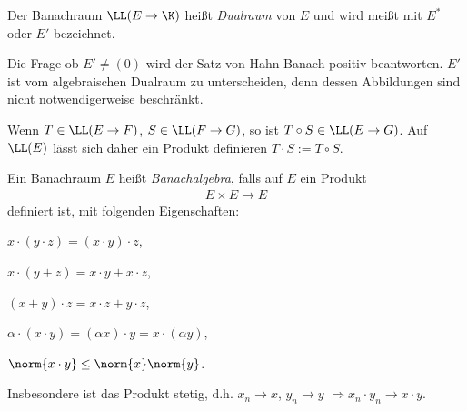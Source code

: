 \begin{defn}
\label{defn:2.10}
Der Banachraum $\LL(E\to\K)$ heißt \emph{Dualraum}
von $E$ und wird meißt mit $E^*$ oder $E'$ bezeichnet.\fishhere
\end{defn}

Die Frage ob $E'\neq(0)$ wird der Satz von Hahn-Banach positiv beantworten.
$E'$ ist vom algebraischen Dualraum zu unterscheiden, denn dessen Abbildungen
sind nicht notwendigerweise beschränkt.

\begin{bem}
\label{bem:2.11}
Wenn $T\in \LL(E\to F)$, $S\in\LL(F\to G)$, so ist $T\circ S\in\LL(E\to G)$.
Auf $\LL(E)$ lässt sich daher ein Produkt definieren $T\cdot S := T\circ
S$.\maphere
\end{bem}

\begin{defn}
\label{defn:2.12}
Ein Banachraum $E$ heißt \emph{Banachalgebra},
falls auf $E$ ein Produkt
\begin{align*}
E\times E\to E
\end{align*}
definiert ist, mit folgenden Eigenschaften:
\begin{defnenum}
  \item $x\cdot(y\cdot z) = (x\cdot y)\cdot z$,
  \item $x\cdot(y+z) = x\cdot y + x\cdot z$,
  \item $(x+y)\cdot z = x\cdot z + y\cdot z$,
  \item $\alpha\cdot(x\cdot y) = (\alpha x)\cdot y = x\cdot(\alpha y)$,
  \item $\norm{x\cdot y}\le \norm{x}\norm{y}$.
\end{defnenum}
Insbesondere ist das Produkt stetig, d.h. $x_n\to x$, $y_n\to y$ $\Rightarrow
x_n\cdot y_n \to x\cdot y$.\fishhere
\end{defn}